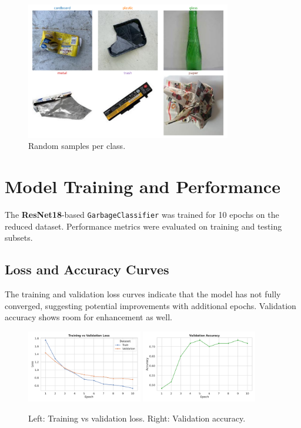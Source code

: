 \documentclass[12pt]{article}
\begin{document}
\begin{figure}[h!]
    \centering
    \includegraphics[width=0.8\textwidth]{figures/EDA/random_examples_per_class.pdf}
    \caption{Random samples per class.}
    \label{fig:rand_samples}
\end{figure}

\newpage
\section{Model Training and Performance}
The \textbf{ResNet18}-based \texttt{GarbageClassifier} was trained for 10 epochs on the reduced dataset. Performance metrics were evaluated on training and testing subsets.

\subsection{Loss and Accuracy Curves}
The training and validation loss curves indicate that the model has not fully converged, suggesting potential improvements with additional epochs. Validation accuracy shows room for enhancement as well.

\begin{figure}[h!]
    \centering
    \includegraphics[width=0.45\textwidth]{figures/performance/train_vs_val_loss.pdf}
    \includegraphics[width=0.45\textwidth]{figures/performance/val_acc.pdf}
    \caption{Left: Training vs validation loss. Right: Validation accuracy.}
    \label{fig:loss_acc}
\end{figure}
\end{document}
